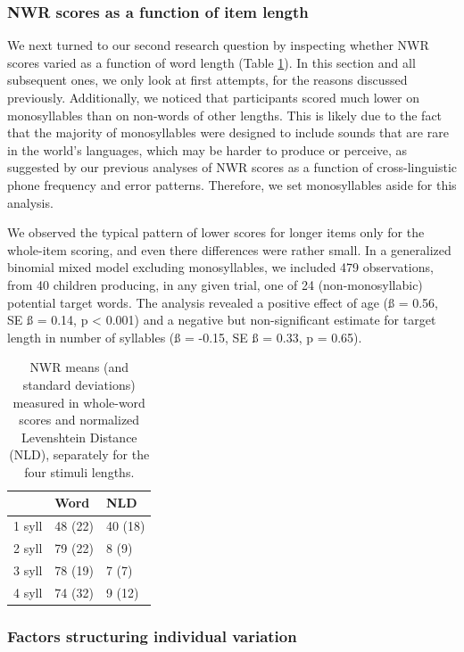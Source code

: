 \documentclass[english,,man,floatsintext]{apa6}
\begin{document}
\hypertarget{nwr-scores-as-a-function-of-item-length}{%
\subsubsection{NWR scores as a function of item length}\label{nwr-scores-as-a-function-of-item-length}}

We next turned to our second research question by inspecting whether NWR scores varied as a function of word length (Table \ref{tab:tablength}). In this section and all subsequent ones, we only look at first attempts, for the reasons discussed previously. Additionally, we noticed that participants scored much lower on monosyllables than on non-words of other lengths. This is likely due to the fact that the majority of monosyllables were designed to include sounds that are rare in the world's languages, which may be harder to produce or perceive, as suggested by our previous analyses of NWR scores as a function of cross-linguistic phone frequency and error patterns. Therefore, we set monosyllables aside for this analysis.

We observed the typical pattern of lower scores for longer items only for the whole-item scoring, and even there differences were rather small. In a generalized binomial mixed model excluding monosyllables, we included 479 observations, from 40 children producing, in any given trial, one of 24 (non-monosyllabic) potential target words. The analysis revealed a positive effect of age (ß = 0.56, SE ß = 0.14, p \textless{} 0.001) and a negative but non-significant estimate for target length in number of syllables (ß = -0.15, SE ß = 0.33, p = 0.65).

\begin{table}

\caption{\label{tab:tablength}NWR means (and standard deviations) measured in whole-word scores and normalized Levenshtein Distance (NLD), separately for the four stimuli lengths.}
\centering
\begin{tabular}[t]{lll}
\toprule
  & Word & NLD\\
\midrule
1 syll & 48 (22) & 40 (18)\\
2 syll & 79 (22) & 8 (9)\\
3 syll & 78 (19) & 7 (7)\\
4 syll & 74 (32) & 9 (12)\\
\bottomrule
\end{tabular}
\end{table}

\hypertarget{factors-structuring-individual-variation}{%
\subsubsection{Factors structuring individual variation}\label{factors-structuring-individual-variation}}
\end{document}
